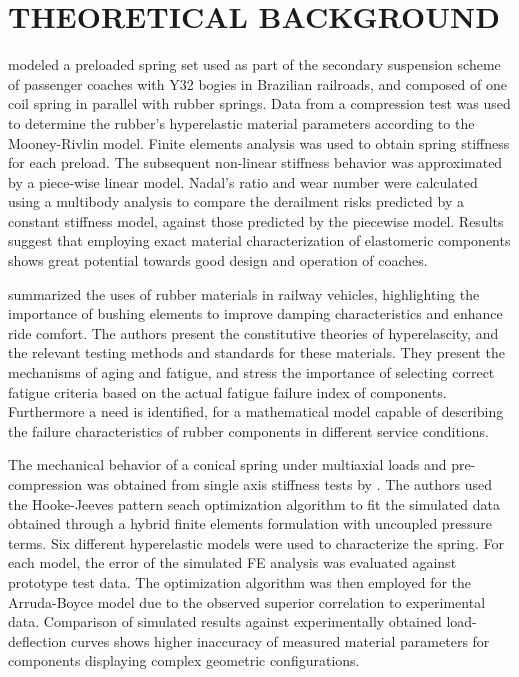 \section{THEORETICAL BACKGROUND}

\textcite{campos2023} modeled a preloaded spring set used as part of the secondary suspension scheme of passenger coaches with Y32 bogies in Brazilian railroads, and composed of one coil spring in parallel with rubber springs. Data from a compression test was used to determine the rubber's hyperelastic material parameters according to the Mooney-Rivlin model. Finite elements analysis was used to obtain spring stiffness for each preload. The subsequent non-linear stiffness behavior was approximated by a piece-wise linear model. Nadal's ratio and wear number were calculated using a multibody analysis to compare the derailment risks predicted by a constant stiffness model, against those predicted by the piecewise model. Results suggest that employing exact material characterization of elastomeric components shows great potential towards good design and operation of coaches.

\textcite{kang2022} summarized the uses of rubber materials in railway vehicles, highlighting the importance of bushing elements to improve damping characteristics and enhance ride comfort. The authors present the constitutive theories of hyperelascity, and the relevant testing methods and standards for these materials. They present the mechanisms of aging and fatigue, and stress the importance of selecting correct fatigue criteria based on the actual fatigue failure index of components. Furthermore a need is identified, for a mathematical model capable of describing the failure characteristics of rubber components in different service conditions.

The mechanical behavior of a conical spring under multiaxial loads and pre-compression was obtained from single axis stiffness tests by \textcite{lalo2019}. The authors used the Hooke-Jeeves pattern seach optimization algorithm to fit the simulated data obtained through a hybrid finite elements formulation with uncoupled pressure terms. Six different hyperelastic models were used to characterize the spring. For each model, the error of the simulated FE analysis was evaluated against prototype test data. The optimization algorithm was then employed for the Arruda-Boyce model due to the observed superior correlation to experimental data. Comparison of simulated results against experimentally obtained load-deflection curves shows higher inaccuracy of measured material parameters for components displaying complex geometric configurations.

